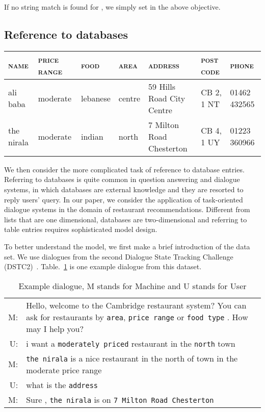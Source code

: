 \documentclass[11pt,letterpaper]{article}
\begin{document}
If no string match is found for , we simply set 
in the above objective.


\subsection{Reference to databases}
\begin{table*}[!thp]
\begin{small}
  \centering
  \begin{tabular}{| p{1.2cm} | l | l | l | p{3.3cm} | l | l |}
    \hline
    \textsc{name} & \textsc{price range} & \textsc{food} & \textsc{area} & \textsc{address} & \textsc{post code} & \textsc{phone} \\
    \hline
    ali baba & moderate & lebanese & centre & 59 Hills Road City Centre & CB 2, 1
                                                                          NT &
                                                                               01462 432565 \\
    \hline
the nirala & moderate & indian & north & 7 Milton Road Chesterton & CB 4, 1 UY & 01223 360966 \\
    \hline
  \end{tabular}
  \caption{Fragment of database for dialogue system.}
  \label{tab:table}
  \end{small}
\end{table*}
We then consider the more complicated task of reference to database entries.
Referring to databases is quite common in question answering and dialogue systems,
in which databases are external knowledge and they are resorted to reply users'
query. In our paper, we consider the application of task-oriented dialogue systems 
in the domain of restaurant recommendations. Different from lists that are one dimensional,
databases are two-dimensional and referring to table entries requires sophisticated model 
design.

To better understand the model, we first make a brief introduction of the data set.
We use dialogues from the second Dialogue State Tracking Challenge
(DSTC2)~\citep{henderson2014dialog}. Table.~\ref{tab:example} is one example
dialogue from this dataset.
\begin{table}[!thbp]
\centering
\begin{tabular}{r  p{6cm}}
  M:& Hello, welcome to the Cambridge restaurant system? You can ask for
      restaurants by \texttt{area}, \texttt{price range} or \texttt{food type} . How may I help you?  \\
  U:& i want a \texttt{moderately priced} restaurant in the \texttt{north} town \\
  M:& \texttt{the nirala} is a nice restaurant in the north of town in the moderate price
      range \\
  U:& what is the \texttt{address} \\
  M:& Sure , \texttt{the nirala} is on \texttt{7 Milton Road Chesterton} \\
\end{tabular}
\caption{Example dialogue, M stands for Machine and U stands for User}
\label{tab:example}
\end{table}
\end{document}
